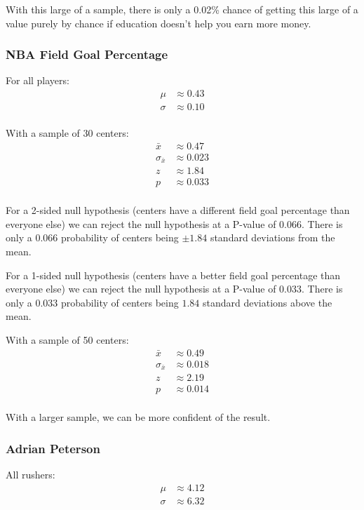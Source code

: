 \documentclass[landscape]{exam}
\begin{document}
  With this large of a sample, there is only a 0.02\% chance of getting this
  large of a value purely by chance if education doesn't help you earn more
  money.


  \subsubsection{NBA Field Goal Percentage}

  For all players:
  \begin{align*}
    \mu    & \approx 0.43 \\
    \sigma & \approx 0.10 \\
  \end{align*}

  With a sample of 30 centers:
  \begin{align*}
    \bar{x}          & \approx 0.47 \\
    \sigma_{\bar{x}} & \approx 0.023 \\
    z                & \approx 1.84 \\
    p                & \approx 0.033 \\
  \end{align*}

  For a 2-sided null hypothesis (centers have a different field goal percentage
  than everyone else) we can reject the null hypothesis at a P-value of 0.066.
  There is only a 0.066 probability of centers being $\pm 1.84$ standard
  deviations from the
  mean.

  For a 1-sided null hypothesis (centers have a better field goal percentage
  than everyone else) we can reject the null hypothesis at a P-value of 0.033.
  There is only a 0.033 probability of centers being $1.84$ standard deviations
  above the mean.

  With a sample of 50 centers:
  \begin{align*}
    \bar{x}          & \approx 0.49 \\
    \sigma_{\bar{x}} & \approx 0.018 \\
    z                & \approx 2.19 \\
    p                & \approx 0.014 \\
  \end{align*}

  With a larger sample, we can be more confident of the result.

  \subsubsection{Adrian Peterson}
  All rushers:
  \begin{align*}
    \mu    & \approx 4.12 \\
    \sigma & \approx 6.32 \\
  \end{align*}
\end{document}
